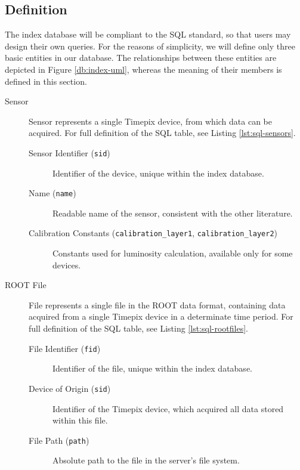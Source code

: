 \subsection{Definition}
The index database will be compliant to the SQL standard, so that users may design their own queries. For the reasons of simplicity, we will define only three basic entities in our database. The relationships between these entities are depicted in Figure \ref{db:index-uml}, whereas the meaning of their members is defined in this section.


\begin{description}
	\item[Sensor]
	Sensor represents a single Timepix device, from which data can be acquired. For full definition of the SQL table, see Listing \ref{lst:sql-sensors}.

	\begin{description}
		\item[Sensor Identifier (\texttt{sid})]
		Identifier of the device, unique within the index database.

		\item[Name (\texttt{name})]
		Readable name of the sensor, consistent with the other literature.

		\item[Calibration Constants (\texttt{calibration\_layer1}, \texttt{calibration\_layer2})]
		Constants used for luminosity calculation, available only for some devices.
	\end{description}

	\item[ROOT File]
	File represents a single file in the ROOT data format, containing data acquired from a single Timepix device in a determinate time period. For full definition of the SQL table, see Listing \ref{lst:sql-rootfiles}.

	\begin{description}
		\item[File Identifier (\texttt{fid})] 
		Identifier of the file, unique within the index database.

		\item[Device of Origin (\texttt{sid})]
		Identifier of the Timepix device, which acquired all data stored within this file.

		\item[File Path (\texttt{path})] 
		Absolute path to the file in the server's file system.


\end{description}
\end{description}
